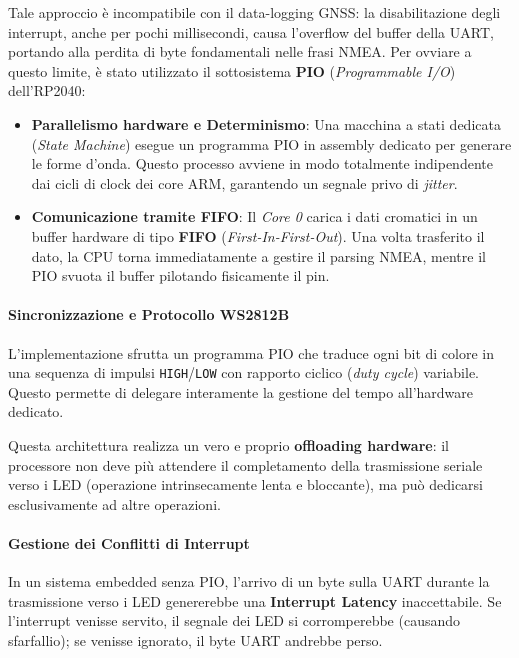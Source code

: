 Tale approccio è incompatibile con il data-logging GNSS: la disabilitazione degli interrupt, anche per pochi millisecondi, causa l'overflow del buffer della UART, portando alla perdita di byte fondamentali nelle frasi NMEA. Per ovviare a questo limite, è stato utilizzato il sottosistema \textbf{PIO} (\textit{Programmable I/O}) dell'RP2040:

\begin{itemize}
    \item \textbf{Parallelismo hardware e Determinismo}: Una macchina a stati dedicata (\textit{State Machine}) esegue un programma PIO in assembly dedicato per generare le forme d'onda. Questo processo avviene in modo totalmente indipendente dai cicli di clock dei core ARM, garantendo un segnale privo di \textit{jitter}.
    \item \textbf{Comunicazione tramite FIFO}: Il \textit{Core 0} carica i dati cromatici in un buffer hardware di tipo \textbf{FIFO} (\textit{First-In-First-Out}). Una volta trasferito il dato, la CPU torna immediatamente a gestire il parsing NMEA, mentre il PIO svuota il buffer pilotando fisicamente il pin.
\end{itemize}

\paragraph{Sincronizzazione e Protocollo WS2812B}

L'implementazione sfrutta un programma PIO che traduce ogni bit di colore in una sequenza di impulsi \texttt{HIGH}/\texttt{LOW} con rapporto ciclico (\textit{duty cycle}) variabile. Questo permette di delegare interamente la gestione del tempo all'hardware dedicato.

Questa architettura realizza un vero e proprio \textbf{offloading hardware}: il processore non deve più attendere il completamento della trasmissione seriale verso i LED (operazione intrinsecamente lenta e bloccante), ma può dedicarsi esclusivamente ad altre operazioni.

\paragraph{Gestione dei Conflitti di Interrupt}

In un sistema embedded senza PIO, l'arrivo di un byte sulla UART durante la trasmissione verso i LED genererebbe una \textbf{Interrupt Latency} inaccettabile. Se l'interrupt venisse servito, il segnale dei LED si corromperebbe (causando sfarfallio); se venisse ignorato, il byte UART andrebbe perso. 

